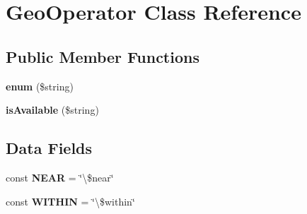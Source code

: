 \hypertarget{class_geo_operator}{\section{Geo\+Operator Class Reference}
\label{class_geo_operator}
}
\subsection*{Public Member Functions}
\begin{DoxyCompactItemize}
\item 
\hypertarget{class_geo_operator_a7967c6e825979f8b2faefba3d95c3821}{{\bfseries enum} (\$string)}\label{class_geo_operator_a7967c6e825979f8b2faefba3d95c3821}

\item 
\hypertarget{class_geo_operator_a30537daeb912ea3e348c579c4f930841}{{\bfseries is\+Available} (\$string)}\label{class_geo_operator_a30537daeb912ea3e348c579c4f930841}

\end{DoxyCompactItemize}
\subsection*{Data Fields}
\begin{DoxyCompactItemize}
\item 
\hypertarget{class_geo_operator_af789a94b612a67bfce7228a87b49752a}{const {\bfseries N\+E\+A\+R} = \char`\"{}\textbackslash{}\$near\char`\"{}}\label{class_geo_operator_af789a94b612a67bfce7228a87b49752a}

\item 
\hypertarget{class_geo_operator_af1b272d29fc2c4b8d6b977fa478e2228}{const {\bfseries W\+I\+T\+H\+I\+N} = \char`\"{}\textbackslash{}\$within\char`\"{}}\label{class_geo_operator_af1b272d29fc2c4b8d6b977fa478e2228}

\end{DoxyCompactItemize}
